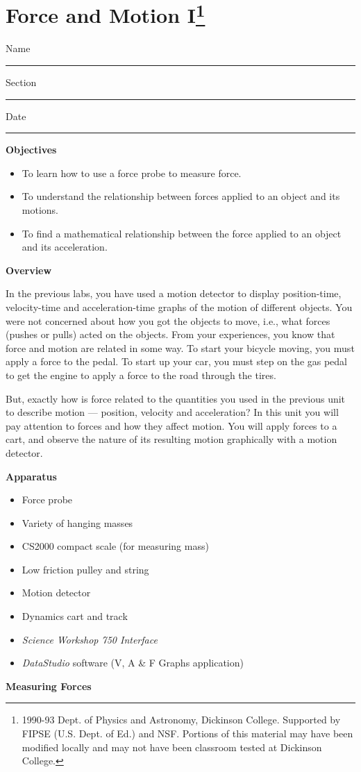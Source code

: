 
\section{Force and Motion I\footnote{
1990-93 Dept. of Physics and Astronomy, Dickinson College. Supported by FIPSE
(U.S. Dept. of Ed.) and NSF. Portions of this material may have been modified
locally and may not have been classroom tested at Dickinson College.
}}

Name \rule{2.0in}{0.1pt}\hfill{}Section \rule{1.0in}{0.1pt}\hfill{}Date \rule{1.0in}{0.1pt}

\textbf{Objectives }

\begin{itemize}
\item To learn how to use a force probe to measure force. 
\item To understand the relationship between forces applied to an object and its motions. 
\item To find a mathematical relationship between the force applied to an object and its acceleration.
\end{itemize}
\textbf{Overview }

In the previous labs, you have used a motion detector to display position-time,
velocity-time and acceleration-time graphs of the motion of different objects.
You were not concerned about how you got the objects to move, i.e., what forces
(pushes or pulls) acted on the objects. From your experiences, you know that
force and motion are related in some way. To start your bicycle moving, you
must apply a force to the pedal. To start up your car, you must step on the
gas pedal to get the engine to apply a force to the road through the tires.

But, exactly how is force related to the quantities you used in the previous
unit to describe motion --- position, velocity and acceleration? In this unit you
will pay attention to forces and how they affect motion. You will apply forces
to a cart, and observe the nature of its resulting motion graphically with a
motion detector.

\textbf{Apparatus} 

\begin{itemize}
\item Force probe 
\item Variety of hanging masses 
\item CS2000 compact scale (for measuring mass)
\item Low friction pulley and string 
\item Motion detector 
\item Dynamics cart and track 
\item \textit{Science Workshop 750 Interface}
\item \textit{DataStudio} software (V, A \& F Graphs application)
\end{itemize}
\textbf{Measuring Forces} 

